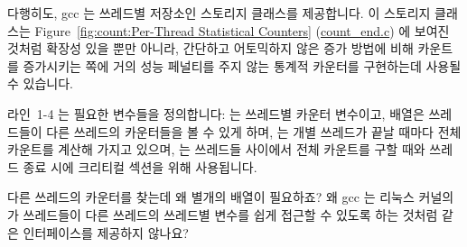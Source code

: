 다행히도, gcc 는 쓰레드별 저장소인  스토리지 클래스를 제공합니다.
이 스토리지 클래스는
Figure~\ref{fig:count:Per-Thread Statistical Counters} (\url{count_end.c})
에 보여진 것처럼 확장성 있을 뿐만 아니라,  간단하고 어토믹하지 않은 증가 방법에
비해 카운트를 증가시키는 쪽에 거의 성능 페널티를 주지 않는 통계적 카운터를
구현하는데 사용될 수 있습니다.

라인~1-4 는 필요한 변수들을 정의합니다:  는 쓰레드별 카운터
변수이고,  배열은 쓰레드들이 다른 쓰레드의 카운터들을 볼 수 있게
하며,  는 개별 쓰레드가 끝날 때마다 전체 카운트를 계산해 가지고
있으며,  는 쓰레드들 사이에서 전체 카운트를 구할 때와 쓰레드
종료 시에 크리티컬 섹션을 위해 사용됩니다.

\QuickQuiz{}
	다른 쓰레드의 카운터를 찾는데 왜 별개의 배열이 필요하죠?
	왜 gcc 는 리눅스 커널의  가 쓰레드들이 다른 쓰레드의
	쓰레드별 변수를 쉽게 접근할 수 있도록 하는 것처럼 
	같은 인터페이스를 제공하지 않나요?
	\iffalse

